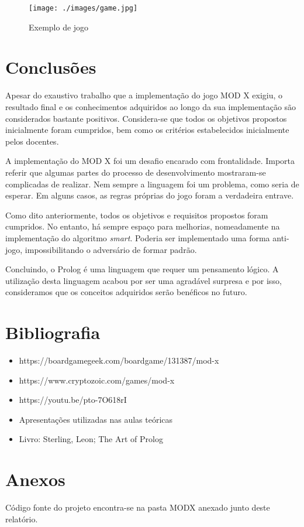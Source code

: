 \documentclass[a4paper]{article}
\begin{document}
\begin{figure}[h!]
	\begin{center}
		\texttt{[image: ./images/game.jpg]}
		\caption{Exemplo de jogo}
		\label{fig:10}
	\end{center}
\end{figure}

\clearpage


\section{Conclusões\newline}

Apesar do exaustivo trabalho que a implementação do jogo MOD X exigiu, o resultado final e os conhecimentos adquiridos ao longo da sua implementação são considerados bastante positivos. Considera-se que todos os objetivos propostos inicialmente foram cumpridos, bem como os critérios estabelecidos inicialmente pelos docentes.

A implementação do MOD X foi um desafio encarado com frontalidade. Importa referir que algumas partes do processo de desenvolvimento mostraram-se complicadas de realizar. Nem sempre a linguagem foi um problema, como seria de esperar. Em alguns casos, as regras próprias do jogo foram a verdadeira entrave. 

Como dito anteriormente, todos os objetivos e requisitos propostos foram cumpridos. No entanto, há sempre espaço para melhorias, nomeadamente na implementação do algoritmo \textit{smart}. Poderia ser implementado uma forma anti-jogo, impossibilitando o adversário de formar padrão.  

Concluindo, o Prolog é uma linguagem que requer um pensamento lógico. A utilização desta linguagem acabou por ser uma agradável surpresa e por isso, consideramos que os conceitos adquiridos serão benéficos no futuro.

\newpage


\section*{Bibliografia\newline}

\begin{itemize}
	\item https://boardgamegeek.com/boardgame/131387/mod-x
	\item https://www.cryptozoic.com/games/mod-x
	\item https://youtu.be/pto-7O618rI
	\item Apresentações utilizadas nas aulas teóricas
	\item Livro: Sterling, Leon; The Art of Prolog
\end{itemize}

\newpage


\section*{Anexos\newline}

Código fonte do projeto encontra-se na pasta MODX anexado junto deste relatório.

\end{document}
